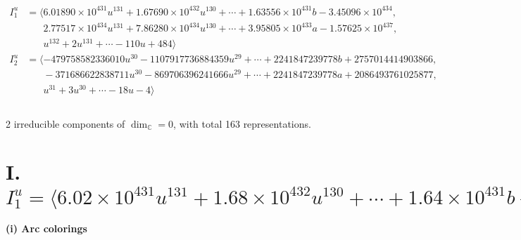 \documentclass[1p]{elsarticle_modified}
\theoremstyle{definition}
\begin{document}
\begin{align*}
I^u_{1}&=\langle 
6.01890\times10^{431} u^{131}+1.67690\times10^{432} u^{130}+\cdots+1.63556\times10^{431} b-3.45096\times10^{434},\\
\phantom{I^u_{1}}&\phantom{= \langle  }2.77517\times10^{434} u^{131}+7.86280\times10^{434} u^{130}+\cdots+3.95805\times10^{433} a-1.57625\times10^{437},\\
\phantom{I^u_{1}}&\phantom{= \langle  }u^{132}+2 u^{131}+\cdots-110 u+484\rangle \\
I^u_{2}&=\langle 
-479758582336010 u^{30}-1107917736884359 u^{29}+\cdots+2241847239778 b+2757014414903866,\\
\phantom{I^u_{2}}&\phantom{= \langle  }-371686622838711 u^{30}-869706396241666 u^{29}+\cdots+2241847239778 a+2086493761025877,\\
\phantom{I^u_{2}}&\phantom{= \langle  }u^{31}+3 u^{30}+\cdots-18 u-4\rangle \\
\\
\end{align*}
\raggedright * 2 irreducible components of $\dim_{\mathbb{C}}=0$, with total 163 representations.\\
\newpage
\renewcommand{\arraystretch}{1}
\centering \section*{I. $I^u_{1}= \langle 6.02\times10^{431} u^{131}+1.68\times10^{432} u^{130}+\cdots+1.64\times10^{431} b-3.45\times10^{434},\;2.78\times10^{434} u^{131}+7.86\times10^{434} u^{130}+\cdots+3.96\times10^{433} a-1.58\times10^{437},\;u^{132}+2 u^{131}+\cdots-110 u+484 \rangle$}
\flushleft \textbf{(i) Arc colorings}\\
\end{document}
